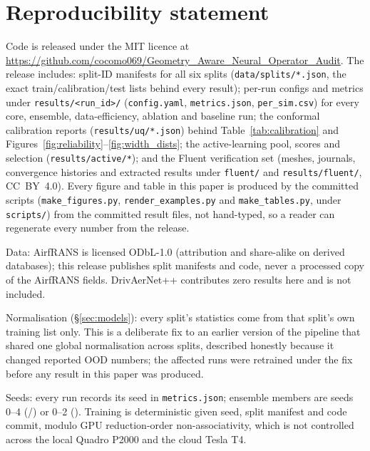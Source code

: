 \section*{Reproducibility statement}
\begingroup\sloppy
Code is released under the MIT licence at
\url{https://github.com/cocomo069/Geometry_Aware_Neural_Operator_Audit}. The
release includes: split-ID manifests for all six splits
(\texttt{data/splits/*.json}, the exact train/calibration/test lists behind
every result); per-run configs and metrics under
\texttt{results/<run\_id>/} (\texttt{config.yaml}, \texttt{metrics.json},
\texttt{per\_sim.csv}) for
every core, ensemble, data-efficiency, ablation and baseline run; the
conformal calibration reports (\texttt{results/uq/*.json}) behind
Table~\ref{tab:calibration} and
Figures~\ref{fig:reliability}--\ref{fig:width_dists}; the active-learning
pool, scores and selection (\texttt{results/active/*}); and the Fluent
verification set (meshes, journals, convergence histories and extracted
results under \texttt{fluent/} and \texttt{results/fluent/}, CC~BY~4.0).
Every figure and table in this paper is produced by the committed scripts
(\texttt{make\_figures.py}, \texttt{render\_examples.py} and
\texttt{make\_tables.py}, under \texttt{scripts/}) from the committed result
files, not hand-typed, so a reader can regenerate every number from the
release.
\endgroup

Data: AirfRANS \citep{bonnet2022airfrans} is licensed ODbL-1.0 (attribution
and share-alike on derived databases); this release publishes split manifests
and code, never a processed copy of the AirfRANS fields. DrivAerNet++
\citep{elrefaie2024drivaernetpp} contributes zero results here and is not
included.

Normalisation (\S\ref{sec:models}): every split's statistics come from that
split's own training list only. This is a deliberate fix to an earlier
version of the pipeline that shared one global normalisation across splits,
described honestly because it changed reported OOD numbers; the affected runs
were retrained under the fix before any result in this paper was produced.

Seeds: every run records its seed in \texttt{metrics.json}; ensemble members
are seeds 0--4 (\Mfno/\Mtrans) or 0--2 (\Mgnn). Training is deterministic
given seed, split manifest and code commit, modulo GPU reduction-order
non-associativity, which is not controlled across the local Quadro P2000 and
the cloud Tesla T4.

